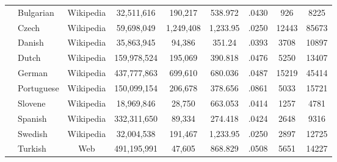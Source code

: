\begin{table}[h!]
\begin{tabular}{@{ }l@{ }|@{ }l@{ }|@{ }c@{ }|@{ }c@{ }|c@{ }|@{ }c@{ }|@{ }c@{ }|@{ }c@{ }|@{ }c@{ }|}
    &Bulgarian& Wikipedia & 32,511,616 & 190,217 & 538.972 & .0430 & 926 & 8225\\
    &Czech & Wikipedia & 59,698,049 & 1,249,408 & 1,233.95 &.0250 & 12443 & 85673\\
    &Danish & Wikipedia & 35,863,945 & 94,386 & 351.24 & .0393 & 3708 & 10897\\
    &Dutch & Wikipedia & 159,978,524 & 195,069 & 390.818 & .0476 & 5250 & 13407\\
    &German & Wikipedia & 437,777,863 & 699,610 & 680.036 & .0487 & 15219 & 45414\\
    &Portuguese & Wikipedia & 150,099,154 & 206,678 & 378.656 & .0861 & 5033 & 15721\\
    &Slovene & Wikipedia & 18,969,846 & 28,750 & 663.053 & .0414  & 1257 & 4781\\
    &Spanish & Wikipedia & 332,311,650 & 89,334 & 274.418 & .0424  & 2648 & 9316\\
    &Swedish & Wikipedia & 32,004,538 & 191,467 & 1,233.95 & .0250  & 2897 & 12725\\
    &Turkish & Web & 491,195,991 & 47,605 & 868.829 & .0508  & 5651 & 14227\\
    \hline
  \end{tabular}
  \label{tab:lmstatistics}
\end{table}
